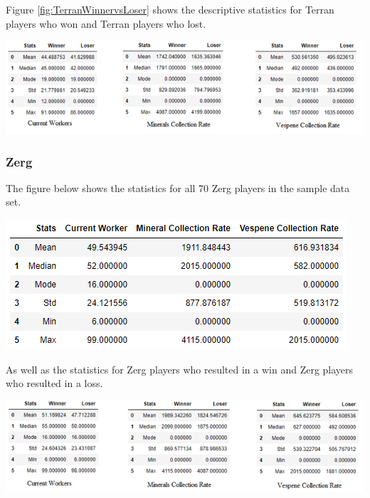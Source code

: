 \documentclass[a4paper,12pt]{report}
\begin{document}
Figure \ref{fig:TerranWinnervsLoser} shows the descriptive statistics for Terran players who won and Terran players who lost. 

\begin{center}
    \captionsetup{type=figure}
    \includegraphics[width=.9\linewidth]{media/TerranWinnervsLoser.png}
    \label{fig:TerranWinnervsLoser}
\end{center}

\subsubsection{Zerg}
The figure below shows the statistics for all 70 Zerg players in the sample data set. 

\begin{center}
    \captionsetup{type=figure}
    \includegraphics[width=.9\linewidth]{media/ZergDescriptive.png}
\end{center}

As well as the statistics for Zerg players who resulted in a win and Zerg players who resulted in a loss. 

\begin{center}
    \captionsetup{type=figure}
    \includegraphics[width=.9\linewidth]{media/ZergWinnervsLoser.png}
\end{center}
\end{document}
